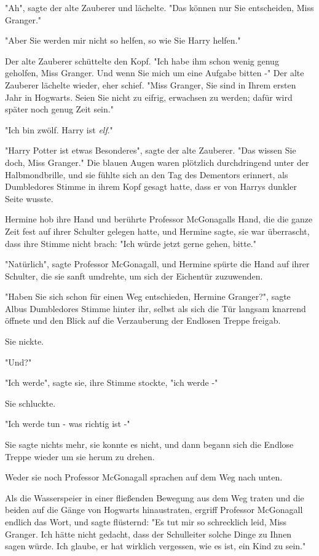 {"Ah", sagte der alte Zauberer und lächelte. "Das können nur Sie entscheiden, Miss Granger."

"Aber Sie werden mir nicht so helfen, so wie Sie Harry helfen."

Der alte Zauberer schüttelte den Kopf. "Ich habe ihm schon wenig genug geholfen, Miss Granger. Und wenn Sie mich um eine Aufgabe bitten -" Der alte Zauberer lächelte wieder, eher schief. "Miss Granger, Sie sind in Ihrem ersten Jahr in Hogwarts. Seien Sie nicht zu eifrig, erwachsen zu werden; dafür wird später noch genug Zeit sein."

"Ich bin zwölf. Harry ist \emph{elf}."

"Harry Potter ist etwas Besonderes", sagte der alte Zauberer. "Das wissen Sie doch, Miss Granger." Die blauen Augen waren plötzlich durchdringend unter der Halbmondbrille, und sie fühlte sich an den Tag des Dementors erinnert, als Dumbledores Stimme in ihrem Kopf gesagt hatte, dass er von Harrys dunkler Seite wusste.

Hermine hob ihre Hand und berührte Professor McGonagalls Hand, die die ganze Zeit fest auf ihrer Schulter gelegen hatte, und Hermine sagte, sie war überrascht, dass ihre Stimme nicht brach: "Ich würde jetzt gerne gehen, bitte."

"Natürlich", sagte Professor McGonagall, und Hermine spürte die Hand auf ihrer Schulter, die sie sanft umdrehte, um sich der Eichentür zuzuwenden.

"Haben Sie sich schon für einen Weg entschieden, Hermine Granger?", sagte Albus Dumbledores Stimme hinter ihr, selbst als sich die Tür langsam knarrend öffnete und den Blick auf die Verzauberung der Endlosen Treppe freigab.

Sie nickte.

"Und?"

"Ich werde", sagte sie, ihre Stimme stockte, "ich werde -"

Sie schluckte.

"Ich werde tun - was richtig ist -"

Sie sagte nichts mehr, sie konnte es nicht, und dann begann sich die Endlose Treppe wieder um sie herum zu drehen.

Weder sie noch Professor McGonagall sprachen auf dem Weg nach unten.

Als die Wasserspeier in einer fließenden Bewegung aus dem Weg traten und die beiden auf die Gänge von Hogwarts hinaustraten, ergriff Professor McGonagall endlich das Wort, und sagte flüsternd: "Es tut mir so schrecklich leid, Miss Granger. Ich hätte nicht gedacht, dass der Schulleiter solche Dinge zu Ihnen sagen würde. Ich glaube, er hat wirklich vergessen, wie es ist, ein Kind zu sein."

}

